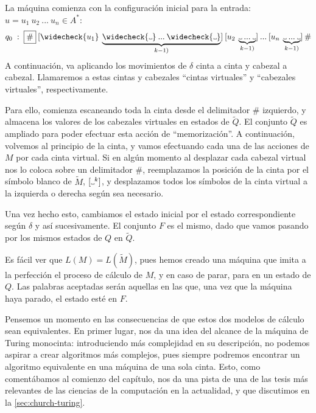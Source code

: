 \begin{proofw}
La máquina comienza con la configuración inicial para la entrada: $u=u_1\:u_2\:...\:u_n\in A^*$:
$$
    q_0\;:\;\fbox{\#}\:[\widecheck{u_1}\:\underbrace{\widecheck{\Vtextvisiblespace} \:... \:\widecheck{\Vtextvisiblespace}}_{k-1)}]\:[u_2\:\underbrace{{\Vtextvisiblespace} \:... \:{\Vtextvisiblespace}}_{k-1)}]\:...\:[u_n\:\underbrace{{\Vtextvisiblespace} \:... \:{\Vtextvisiblespace}}_{k-1)}]\:\#
$$
A continuación, va aplicando los movimientos de $\delta$ cinta a cinta y cabezal a cabezal. Llamaremos a estas cintas y cabezales ``cintas virtuales'' y ``cabezales virtuales'', respectivamente.

Para ello, comienza escaneando toda la cinta desde el delimitador $\#$ izquierdo, y almacena los valores de los cabezales virtuales en estados de $\widetilde{Q}$. El conjunto $\widetilde{Q}$ es ampliado para poder efectuar esta acción de ``memorización''. A continuación, volvemos al principio de la cinta, y vamos efectuando cada una de las acciones de $M$ por cada cinta virtual. Si en algún momento al desplazar cada cabezal virtual nos lo coloca sobre un delimitador $\#$, reemplazamos la posición de la cinta por el símbolo blanco de $\widetilde{M}$, $[\Vtextvisiblespace^k]$, y desplazamos todos los símbolos de la cinta virtual a la izquierda o derecha según sea necesario.

Una vez hecho esto, cambiamos el estado inicial por el estado correspondiente según $\delta$ y así sucesivamente. El conjunto $F$ es el mismo, dado que vamos pasando por los mismos estados de $Q$ en $\widetilde{Q}$.

Es fácil ver que $L(M)=L(\widetilde{M})$, pues hemos creado una máquina que imita a la perfección el proceso de cálculo de $M$, y en caso de parar, para en un estado de $Q$. Las palabras aceptadas serán aquellas en las que, una vez que la máquina haya parado, el estado esté en $F$.
\end{proofw}

Pensemos un momento en las consecuencias de que estos dos modelos de cálculo sean equivalentes. En primer lugar, nos da una idea del alcance de la máquina de Turing monocinta: introduciendo más complejidad en su descripción, no podemos aspirar a crear algoritmos más complejos, pues siempre podremos encontrar un algoritmo equivalente en una máquina de una sola cinta. Esto, como comentábamos al comienzo del capítulo, nos da una pista de una de las tesis más relevantes de las ciencias de la computación en la actualidad, y que discutimos en la \cref{sec:church-turing}.

